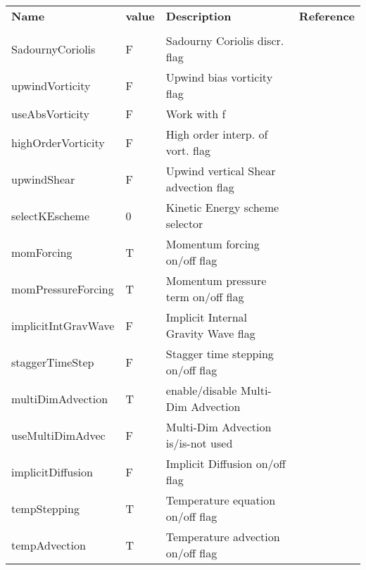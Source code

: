 \newpage
\begin{table}
\begin{tabular}{lllc}

  \textbf{Name}  &  \textbf{value}  
    &  \textbf{Description}   &  \textbf{Reference}  \\
  & & & \\
   SadournyCoriolis  &                     F
    &   Sadourny Coriolis discr. flag 
    &  %
    \\
   upwindVorticity  &                     F
    &   Upwind bias vorticity flag 
    &  %
    \\
   useAbsVorticity  &                     F
    &   Work with f
    &  %
    \\
   highOrderVorticity  &                     F
    &   High order interp. of vort. flag 
    &  %
    \\
   upwindShear  &                     F
    &   Upwind vertical Shear advection flag 
    &  %
    \\
   selectKEscheme  &                         0
    &   Kinetic Energy scheme selector 
    &  %
    \\
   momForcing   &                     T
    &   Momentum forcing on/off flag 
    &  %
    \\
   momPressureForcing   &                     T
    &   Momentum pressure term on/off flag 
    &  %
    \\
   implicitIntGravWave  &                     F
    &   Implicit Internal Gravity Wave flag 
    &  %
    \\
   staggerTimeStep   &                     F
    &   Stagger time stepping on/off flag 
    &  %
    \\
   multiDimAdvection   &                     T
    &   enable/disable Multi-Dim Advection 
    &  %
    \\
   useMultiDimAdvec   &                     F
    &   Multi-Dim Advection is/is-not used 
    &  %
    \\
   implicitDiffusion   &                     F
    &   Implicit Diffusion on/off flag 
    &  %
    \\
   tempStepping   &                     T
    &   Temperature equation on/off flag 
    &  %
    \\
   tempAdvection  &                     T
    &   Temperature advection on/off flag 
    &  %

\end{tabular}
\end{table}
